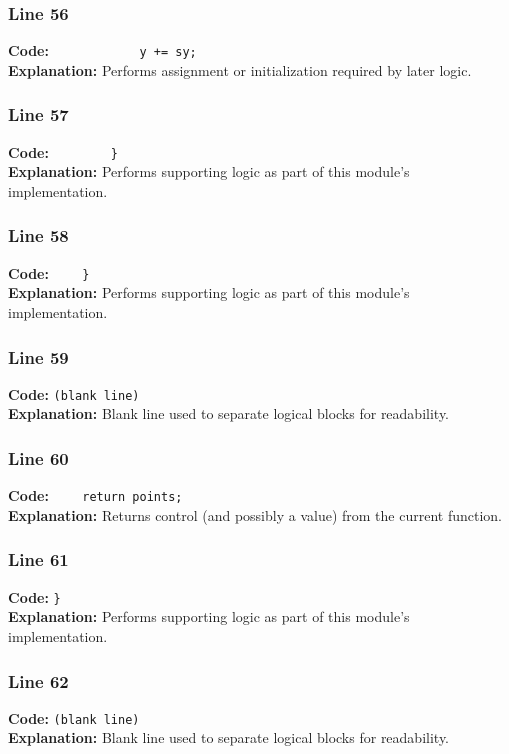 \documentclass[11pt,a4paper]{article}
\begin{document}
\subsubsection*{Line 56}
\textbf{Code:} \verb|            y += sy;|\\
\textbf{Explanation:} Performs assignment or initialization required by later logic.

\subsubsection*{Line 57}
\textbf{Code:} \verb|        }|\\
\textbf{Explanation:} Performs supporting logic as part of this module's implementation.

\subsubsection*{Line 58}
\textbf{Code:} \verb|    }|\\
\textbf{Explanation:} Performs supporting logic as part of this module's implementation.

\subsubsection*{Line 59}
\textbf{Code:} \texttt{(blank line)}\\
\textbf{Explanation:} Blank line used to separate logical blocks for readability.

\subsubsection*{Line 60}
\textbf{Code:} \verb|    return points;|\\
\textbf{Explanation:} Returns control (and possibly a value) from the current function.

\subsubsection*{Line 61}
\textbf{Code:} \verb|}|\\
\textbf{Explanation:} Performs supporting logic as part of this module's implementation.

\subsubsection*{Line 62}
\textbf{Code:} \texttt{(blank line)}\\
\textbf{Explanation:} Blank line used to separate logical blocks for readability.
\end{document}
